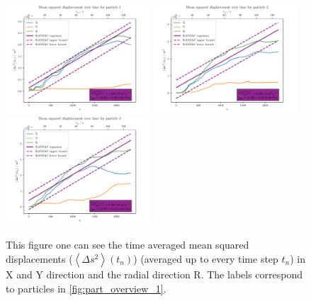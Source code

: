 \documentclass[12pt,english,ngerman]{scrartcl}
\begin{document}
\begin{figure}[H]
	\centering
	\includegraphics[width=0.48\textwidth]{figures/I1_particle_1.pdf}
	\includegraphics[width=0.48\textwidth]{figures/I1_particle_2.pdf}
	\includegraphics[width=0.48\textwidth]{figures/I1_particle_3.pdf}
	\caption[Time averaged mean squared displacements from the particles of the first
		capture]{This figure one can see the time averaged mean squared displacements
		($\left\langle \Delta s^2 \right\rangle(t_n)$) (averaged up to every time step
		$t_n$) in X and Y direction and the radial direction R. The labels correspond
		to particles in \autoref{fig:part_overview_1}.
	}\label{fig:part_first}
\end{figure}
\end{document}
